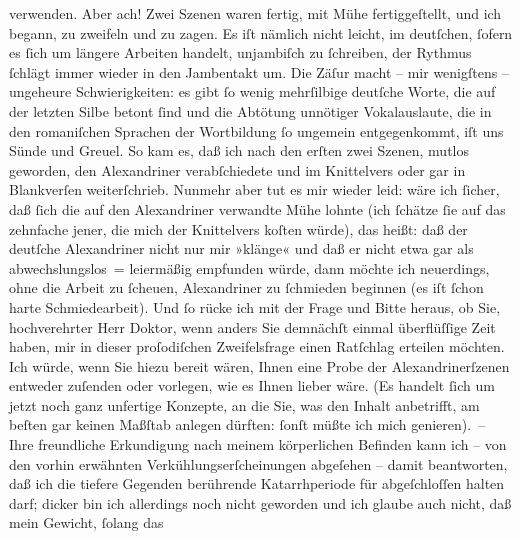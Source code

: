 \begin{ledgroupsized}[t]{13cm}
               verwenden. Aber ach! Zwei Szenen waren fertig, mit Mühe fertiggeſtellt, und ich
               begann, zu zweifeln und zu zagen. Es iſt nämlich nicht leicht, im deutſchen, ſofern
               es ſich um längere Arbeiten handelt, unjambiſch zu ſchreiben, der Rythmus ſchlägt
               immer wieder in den Jambentakt um. Die Zäſur macht – mir wenigſtens – ungeheure
               Schwierigkeiten: es gibt ſo wenig 
               mehrſilbige deutſche Worte, die auf der letzten Silbe betont {\pb}ſind und die Abtötung unnötiger Vokalauslaute, die in
               den romaniſchen Sprachen der Wortbildung ſo ungemein entgegenkommt, iſt uns Sünde und Greuel. So kam es, daß ich nach
               den erſten zwei Szenen, mutlos geworden, den Alexandriner verabſchiedete und im
               Knittelvers oder gar in Blankverſen weiterſchrieb. Nunmehr aber tut es mir wieder
               leid: wäre ich ſicher, daß ſich die auf den Alexandriner verwandte Mühe lohnte (ich
               ſchätze ſie auf das zehnfache jener, die mich der Knittelvers koſten würde), das
               heißt: daß der deutſche Alexandriner nicht nur mir »klänge« und daß er nicht etwa gar
               als abwechslungslos = leiermäßig empfunden würde, dann möchte ich neuerdings, ohne
               die Arbeit zu ſcheuen, Alexandriner zu ſchmieden beginnen (es iſt ſchon harte
               Schmiedearbeit).\pend
           \pstart
           Und ſo rücke ich mit der Frage und Bitte heraus, ob Sie, hochverehrter Herr Doktor,
               wenn anders Sie demnächſt einmal überflüſſige Zeit haben, mir {\pb}in dieser proſodiſchen Zweifelsfrage einen Ratſchlag
               erteilen möchten. Ich würde, wenn Sie hiezu bereit wären, Ihnen eine Probe der
               Alexandrinerſzenen entweder zuſenden oder vorlegen, wie es Ihnen lieber wäre. (Es
               handelt ſich um jetzt noch ganz unfertige Konzepte, an die Sie, was den Inhalt
               anbetrifft, am beſten gar keinen Maßſtab anlegen dürften: ſonſt müßte ich mich
               genieren). –\pend
           \pstart
           Ihre freundliche Erkundigung nach meinem körperlichen Befinden kann ich – von den
               vorhin erwähnten Verkühlungserſcheinungen abgeſehen – damit beantworten, daß ich die
               tiefere Gegenden berührende Katarrhperiode für
               abgeſchloſſen halten darf; dicker bin ich allerdings noch nicht geworden und ich
               glaube auch nicht, daß mein Gewicht, ſolang das \label{K_L02246-1v}
\end{ledgroupsized}
